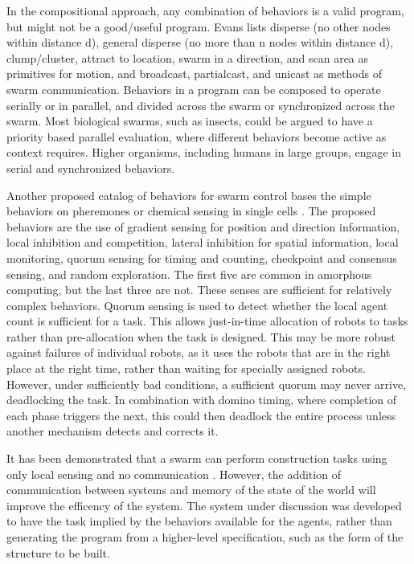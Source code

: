 \documentclass[]{article}
\begin{document}
In the compositional approach, any combination of behaviors is a valid program, but might not be a good/useful program. 
Evans lists disperse (no other nodes within distance d), general disperse (no more than n nodes within distance d), clump/cluster, attract to location, swarm in a direction, and scan area as primitives for motion, and broadcast, partialcast, and unicast as methods of swarm communication.
Behaviors in a program can be composed to operate serially or in parallel, and divided across the swarm or synchronized across the swarm. 
Most biological swarms, such as insects, could be argued to have a priority based parallel evaluation, where different behaviors become active as context requires.
Higher organisms, including humans in large groups, engage in serial and synchronized behaviors. %

Another proposed catalog of behaviors for swarm control bases the simple behaviors on pheremones or chemical sensing in single cells \cite{nagpal2004catalog}. 
The proposed behaviors are the use of gradient sensing for position and direction information, local inhibition and competition, lateral inhibition for spatial information, local monitoring, quorum sensing for timing and counting, checkpoint and consensus sensing, and random exploration. 
The first five are common in amorphous computing, but the last three are not. %
These senses are sufficient for relatively complex behaviors. 
Quorum sensing is used to detect whether the local agent count is sufficient for a task. 
This allows just-in-time allocation of robots to tasks rather than pre-allocation when the task is designed. 
This may be more robust against failures of individual robots, as it uses the robots that are in the right place at the right time, rather than waiting for specially assigned robots. 
However, under sufficiently bad conditions, a sufficient quorum may never arrive, deadlocking the task. 
In combination with domino timing, where completion of each phase triggers the next, this could then deadlock the entire process unless another mechanism detects and corrects it.

It has been demonstrated that a swarm can perform construction tasks using only local sensing and no communication \cite{wawerla2002collective, bowyer2000automated}.
However, the addition of communication between systems and memory of the state of the world will improve the efficency of the system.
The system under discussion was developed to have the task implied by the behaviors available for the agents, rather than generating the program from a higher-level specification, such as the form of the structure to be built.
\end{document}
